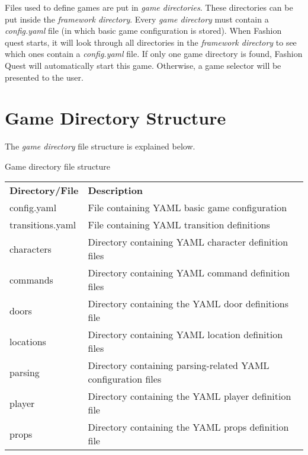 \documentclass[letterpaper,10pt,english]{sphinxmanual}
\begin{document}
Files used to define games are put in \emph{game directories}. These directories can be put inside the \emph{framework directory}. Every \emph{game directory} must contain a \emph{config.yaml} file (in which basic game configuration is stored). When Fashion quest starts, it will look through all directories in the \emph{framework directory} to see which ones contain a \emph{config.yaml} file. If only one game directory is found, Fashion Quest will automatically start this game. Otherwise, a game selector will be presented to the user.


\section{Game Directory Structure}
\label{overview:game-directory-structure}
The \emph{game directory} file structure is explained below.

\begin{threeparttable}
\capstart\caption{Game directory file structure}

\begin{tabulary}{\linewidth}{|L|L|}
\hline

\textbf{Directory/File}
 & 
\textbf{Description}
\\

config.yaml
 & 
File containing YAML basic game configuration
\\

transitions.yaml
 & 
File containing YAML transition definitions
\\

characters
 & 
Directory containing YAML character definition files
\\

commands
 & 
Directory containing YAML command definition files
\\

doors
 & 
Directory containing the YAML door definitions file
\\

locations
 & 
Directory containing YAML location definition files
\\

parsing
 & 
Directory containing parsing-related YAML configuration files
\\

player
 & 
Directory containing the YAML player definition file
\\

props
 & 
Directory containing the YAML props definition file
\\
\hline
\end{tabulary}

\end{threeparttable}
\end{document}
